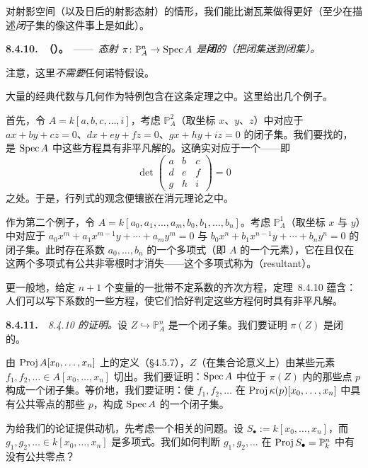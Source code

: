 对射影空间（以及日后的射影态射）的情形，我们能比谢瓦莱做得更好（至少在描述\emph{闭}子集的像这件事上是如此）。

\textbf{8.4.10.\ \trhTheorem{}（\trFundamentalTheoremOfEliminationTheory{}）。}\ ——\ \emph{态射 $\pi\colon\mathbb{P}^n_A\to\operatorname{Spec} A$ 是\textbf{闭}的（\emph{把闭集送到闭集}）。}

注意，这里\emph{不需要}任何诺特假设。

大量的经典代数与几何作为特例包含在这条定理之中。这里给出几个例子。

首先，令 $A=k[a,b,c,\dots,i]$，考虑 $\mathbb{P}^2_A$（取坐标 $x$、$y$、$z$）中对应于 $ax+by+cz=0$、$dx+ey+fz=0$、$gx+hy+iz=0$ 的闭子集。我们要找的，是 $\operatorname{Spec} A$ 中这些方程具有非平凡解的\trLocus。这确实对应于一个\trZariski\trClosedSet——即
\[
\det\begin{pmatrix}a&b&c\\ d&e&f\\ g&h&i\end{pmatrix}=0
\]
之处。于是，行列式的观念便镶嵌在消元理论之中。

作为第二个例子，令 $A=k[a_0,a_1,\dots,a_m,b_0,b_1,\dots,b_n]$。考虑 $\mathbb{P}^1_A$（取坐标 $x$ 与 $y$）中对应于 $a_0x^m+a_1x^{m-1}y+\cdots+a_my^m=0$ 与 $b_0x^n+b_1x^{n-1}y+\cdots+b_ny^n=0$ 的闭子集。此时存在系数 $a_0,\dots,b_n$ 的一个多项式（即 $A$ 的一个元素），它在且仅在这两个多项式有公共非零根时才消失——这个多项式称为\emph{\trResultant{}}（resultant）。

更一般地，给定 $n+1$ 个变量的一批带不定系数的齐次方程，定理~8.4.10 蕴含：人们可以写下系数的一些方程，使它们恰好判定这些方程何时具有非平凡解。

\textbf{8.4.11.}\ \emph{\trFundamentalTheoremOfEliminationTheory{}~8.4.10 的证明。}\quad 设 $Z\hookrightarrow\mathbb{P}^n_A$ 是一个闭子集。我们要证明 $\pi(Z)$ 是闭的。

由 $\operatorname{Proj} A[x_0,\dots,x_n]$ 上\trZariskiTopology{}的定义（\S4.5.7），$Z$（在集合论意义上）由某些\trHomogeneous{}元素 $f_1,f_2,\dots\in A[x_0,\dots,x_n]$ 切出。我们要证明：$\operatorname{Spec} A$ 中位于 $\pi(Z)$ 内的那些点 $p$ 构成一个闭子集。等价地，我们要证明：使 $f_1,f_2,\dots$ 在 $\operatorname{Proj}\kappa(p)[x_0,\dots,x_n]$ 中具有公共零点的那些 $p$，构成 $\operatorname{Spec} A$ 的一个闭子集。

为给我们的论证提供动机，先考虑一个相关的问题。设 $S_\bullet:=k[x_0,\dots,x_n]$，而 $g_1,g_2,\dots\in k[x_0,\dots,x_n]$ 是\trHomogeneous{}多项式。我们如何判断 $g_1,g_2,\dots$ 在 $\operatorname{Proj} S_\bullet=\mathbb{P}^n_k$ 中有没有公共零点？


